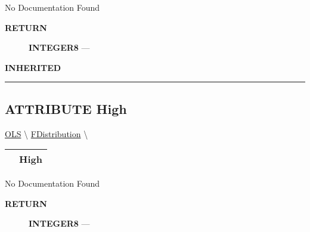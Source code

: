 No Documentation Found








\par
\begin{description}
\item [\colorbox{tagtype}{\color{white} \textbf{\textsf{RETURN}}}] \textbf{INTEGER8} --- 
\end{description}






\par
\begin{description}
\item [\colorbox{tagtype}{\color{white} \textbf{\textsf{INHERITED}}}] 
\end{description}



\rule{\linewidth}{0.5pt}
\subsection*{\textsf{\colorbox{headtoc}{\color{white} ATTRIBUTE}
High}}

\hypertarget{ecldoc:linearregression.ols.fdistribution.high}{}
\hspace{0pt} \hyperlink{ecldoc:linearregression.ols}{OLS} \textbackslash 
\hspace{0pt} \hyperlink{ecldoc:linearregression.ols.fdistribution}{FDistribution} \textbackslash 

{\renewcommand{\arraystretch}{1.5}
\begin{tabularx}{\textwidth}{|>{\raggedright\arraybackslash}l|X|}
\hline
\hspace{0pt}\mytexttt{\color{red} } & \textbf{High} \\
\hline
\end{tabularx}
}

\par





No Documentation Found








\par
\begin{description}
\item [\colorbox{tagtype}{\color{white} \textbf{\textsf{RETURN}}}] \textbf{INTEGER8} --- 
\end{description}






